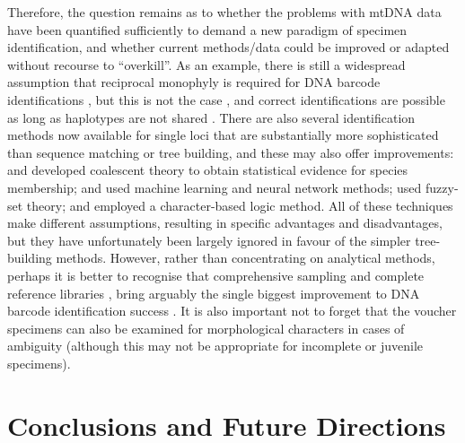 \documentclass[12pt]{article}
\begin{document}
Therefore, the question remains as to whether the problems with mtDNA data have been quantified sufficiently to demand a new paradigm of specimen identification, and whether current methods/data could be improved or adapted without recourse to ``overkill''. As an example, there is still a widespread assumption that reciprocal monophyly is required for DNA barcode identifications \citep{Goldstein2011}, but this is not the case \citep{Meier2008}, and correct identifications are possible as long as haplotypes are not shared \citep{Meier2006}. There are also several identification methods now available for single loci that are substantially more sophisticated than sequence matching or tree building, and these may also offer improvements: \citet{Nielsen2006} and \citet{Abdo2007} developed coalescent theory to obtain statistical evidence for species membership; \citet{Zhang2008} and \citet{Zhang2012a} used machine learning and neural network methods; \citet{Zhang2012b} used fuzzy-set theory; and \citet{Weitschek2013} employed a character-based logic method. All of these techniques make different assumptions, resulting in specific advantages and disadvantages, but they have unfortunately been largely ignored in favour of the simpler tree-building methods. However, rather than concentrating on analytical methods, perhaps it is better to recognise that comprehensive sampling and complete reference libraries \citep{Boykin2012,Virgilio2012}, bring arguably the single biggest improvement to DNA barcode identification success \citep{Ekrem2007}. It is also important not to forget that the  voucher specimens can also be examined for morphological characters in cases of ambiguity (although this may not be appropriate for incomplete or juvenile specimens).

\section*{Conclusions and Future Directions}
\end{document}
